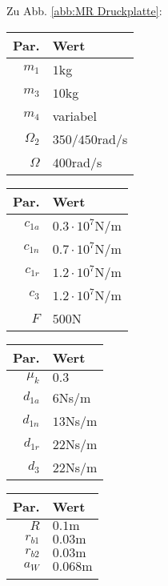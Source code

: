 Zu Abb. \ref{abb:MR Druckplatte}:
\begin{center}
\begin{tabular}{r|l}
Par. &Wert\\\hline
$m_1$&$1$kg\\
$m_3$&$10$kg\\
$m_4$&variabel \\
$\Omega_2$&$350$/$450$rad/s\\
$\Omega$&$400$rad/s\\
\end{tabular} \hfill
\begin{tabular}{r|l}
Par. &Wert\\\hline
$c_{1a}$&$0.3\cdot10^{7}$N/m\\
$c_{1n}$&$0.7\cdot10^{7}$N/m \\
$c_{1r}$ & $1.2\cdot10^{7}$N/m\\
$c_{3}$ & $1.2\cdot10^{7}$N/m\\
$F$&$500$N\\
\end{tabular} \hfill
\begin{tabular}{r|l}
Par. &Wert\\\hline
$\mu_k$& $0.3$\\
$d_{1a}$&$6$Ns/m\\
$d_{1n}$&$13$Ns/m \\
$d_{1r}$ &$22$Ns/m\\
$d_{3}$ & $22$Ns/m\\
\end{tabular} \hfill
\begin{tabular}{r|l}
Par. &Wert\\\hline
$R$&$0.1\textrm{m}$ \\
$r_{b1}$&$ 0.03\textrm{m}$\\
$r_{b2}$&$ 0.03\textrm{m}$\\
$a_{W}$&$ 0.068\textrm{m}$\\
&
\end{tabular}
\end{center}

